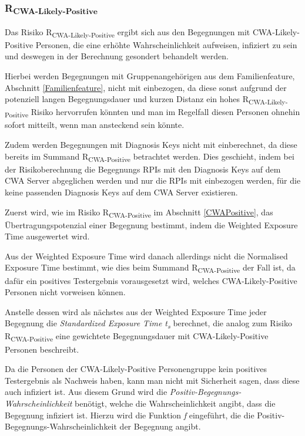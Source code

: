 \documentclass[conference,compsoc]{IEEEtran}
\begin{document}
\subsubsection{R\textsubscript{CWA-Likely-Positive}}
\label{CWALikelyPositive}

Das Risiko R\textsubscript{CWA-Likely-Positive} ergibt sich aus den Begegnungen mit CWA-Likely-Positive Personen, 
die eine erhöhte Wahrscheinlichkeit aufweisen, infiziert zu sein und deswegen in der Berechnung gesondert behandelt werden. 

Hierbei werden Begegnungen mit Gruppenangehörigen aus dem Familienfeature, Abschnitt \ref{Familienfeature}, nicht mit einbezogen, 
da diese sonst aufgrund der potenziell langen Begegnungsdauer und kurzen Distanz ein hohes R\textsubscript{CWA-Likely-Positive} Risiko hervorrufen könnten und 
man im Regelfall diesen Personen ohnehin sofort mitteilt, wenn man ansteckend sein könnte. 

Zudem werden Begegnungen mit Diagnosis Keys nicht mit einberechnet, da diese bereits im Summand R\textsubscript{CWA-Positive} betrachtet werden. 
Dies geschieht, indem bei der Risikoberechnung die Begegnungs RPIs mit den Diagnosis Keys auf dem CWA Server abgeglichen werden und nur die RPIs mit einbezogen werden, 
für die keine passenden Diagnosis Keys auf dem CWA Server existieren.

Zuerst wird, wie im Risiko R\textsubscript{CWA-Positive} im Abschnitt \ref{CWAPositive}, das Übertragungspotenzial einer Begegnung bestimmt, 
indem die Weighted Exposure Time ausgewertet wird. 

Aus der Weighted Exposure Time wird danach allerdings nicht die Normalised Exposure Time bestimmt, wie dies beim Summand R\textsubscript{CWA-Positive} der Fall ist, 
da dafür ein positives Testergebnis vorausgesetzt wird, welches CWA-Likely-Positive Personen nicht vorweisen können.

Anstelle dessen wird als nächstes aus der Weighted Exposure Time jeder Begegnung die \textit{Standardized Exposure Time t\textsubscript{s}} berechnet,
die analog zum Risiko R\textsubscript{CWA-Positive} eine gewichtete Begegnungsdauer mit CWA-Likely-Positive Personen beschreibt.

Da die Personen der CWA-Likely-Positive Personengruppe kein positives Testergebnis als Nachweis haben, 
kann man nicht mit Sicherheit sagen, dass diese auch infiziert ist. 
Aus diesem Grund wird die \textit{Positiv-Begegnungs-Wahrscheinlichkeit} benötigt, welche die Wahrscheinlichkeit angibt, dass die Begegnung infiziert ist. 
Hierzu wird die Funktion \textit{f} eingeführt, die die Positiv-Begegnungs-Wahrscheinlichkeit der Begegnung angibt.
\end{document}

